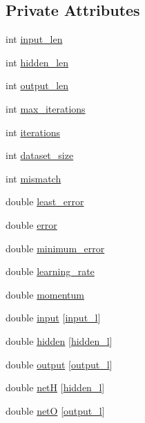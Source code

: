 \subsection*{Private Attributes}
\begin{DoxyCompactItemize}
\item 
int \hyperlink{a00003_a9e5319bf385fa55bbbd8f0160915306d}{input\-\_\-len}
\item 
int \hyperlink{a00003_a71cc8ca03da47fe639dd1e8ed518069c}{hidden\-\_\-len}
\item 
int \hyperlink{a00003_a053d2b510e07b1f25ef112f366bc62ba}{output\-\_\-len}
\item 
int \hyperlink{a00003_ac3c1eed9835dc5da84132d08c090612f}{max\-\_\-iterations}
\item 
int \hyperlink{a00003_a99100a67cd1859c7a5024ba5e8d4ac66}{iterations}
\item 
int \hyperlink{a00003_a8fe39196b36a38696abd679328dd8232}{dataset\-\_\-size}
\item 
int \hyperlink{a00003_a018a2a3717a3a8bb66fe8914478e29b2}{mismatch}
\item 
double \hyperlink{a00003_a16a71525bcd3f7954146f12036f60da1}{least\-\_\-error}
\item 
double \hyperlink{a00003_a2ffe42aee798e268d4bbf0f3428ba430}{error}
\item 
double \hyperlink{a00003_aa2898d2ec7ac091b6d40916d4b113a93}{minimum\-\_\-error}
\item 
double \hyperlink{a00003_a1994986029a1ef9d55fa4bb1b440210b}{learning\-\_\-rate}
\item 
double \hyperlink{a00003_a3a3ea713384da26e538bc60da8410a75}{momentum}
\item 
double \hyperlink{a00003_a347a1fceb1ac048ecd913a89126cebb3}{input} \mbox{[}\hyperlink{a00008_a8dae3b2c955083e02ba56da92adbf25d}{input\-\_\-l}\mbox{]}
\item 
double \hyperlink{a00003_a5b31deacdc5c63e687d6ebc086b761ab}{hidden} \mbox{[}\hyperlink{a00008_aa7fdf42e8c0a65ea15cb37a990708e36}{hidden\-\_\-l}\mbox{]}
\item 
double \hyperlink{a00003_abe5631cce6141b7756154a5a9d247da2}{output} \mbox{[}\hyperlink{a00008_a0a0ddfc9fb3bc3d90d175ed1f7bd54c5}{output\-\_\-l}\mbox{]}
\item 
double \hyperlink{a00003_aa07e5b1f8997f895d7550495a5b4f0d2}{net\-H} \mbox{[}\hyperlink{a00008_aa7fdf42e8c0a65ea15cb37a990708e36}{hidden\-\_\-l}\mbox{]}
\item 
double \hyperlink{a00003_a8bcf19afde3c08afbd862759c839a769}{net\-O} \mbox{[}\hyperlink{a00008_a0a0ddfc9fb3bc3d90d175ed1f7bd54c5}{output\-\_\-l}\mbox{]}

\end{DoxyCompactItemize}
